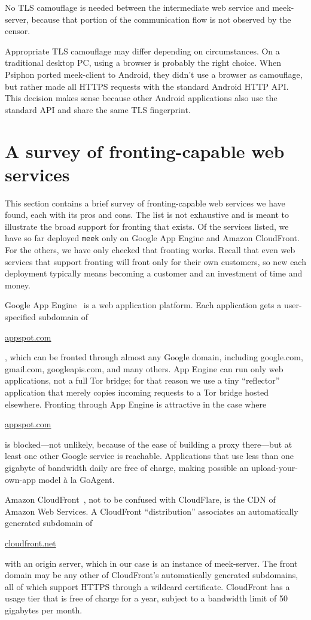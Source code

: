 \documentclass[conference]{IEEEtran}
\newcommand{\meekclient}{\mbox{meek-client}\xspace}
\newcommand{\meekserver}{\mbox{meek-server}\xspace}
\newcommand{\meek}{\texttt{meek}\xspace}
\def\urll#1{\begin{NoHyper}\url{#1}\end{NoHyper}}
\begin{document}
No TLS camouflage is needed between the intermediate web service and \meekserver,
because that portion of the communication flow is not observed by the censor.

Appropriate TLS camouflage may differ depending on circumstances.
On a traditional desktop PC, using a browser is probably the right choice.
When Psiphon ported \meekclient to Android,
they didn't use a browser as camouflage,
but rather made all HTTPS requests with the standard Android HTTP API.
This decision makes sense because other Android applications
also use the standard API and share the same TLS fingerprint.

\section{A survey of fronting-capable web services}
\label{sec:survey}

This section contains a brief survey of fronting-capable
web services we have found, each with its pros and cons.
The list is not exhaustive and is meant to illustrate the broad
support for fronting that exists.
Of the services listed, we have so far deployed \meek
only on Google App Engine and Amazon CloudFront.
For the others, we have only checked that fronting works.
Recall that even web services that support fronting
will front only for their own customers,
so new each deployment typically means becoming a customer and an investment of time and money.

Google App Engine~\cite{googleappengine}
is a web application platform.
Each application gets a user-specified subdomain of \urll{appspot.com},
which can be fronted through almost any Google domain,
including google.com, gmail.com, googleapis.com, and many others.
App Engine can run only web applications,
not a full Tor bridge;
for that reason we use a tiny ``reflector'' application
that merely copies incoming requests to a Tor bridge hosted elsewhere.
Fronting through App Engine is attractive in the case where
\urll{appspot.com} is blocked---not unlikely,
because of the ease of building a proxy there---but
at least one other Google service is reachable.
Applications that use less than one gigabyte of bandwidth daily
are free of charge,
making possible an upload-your-own-app model
à la GoAgent.

Amazon CloudFront~\cite{cloudfront},
not to be confused with CloudFlare,
is the CDN of Amazon Web Services.
A CloudFront ``distribution'' associates
an automatically generated subdomain of \urll{cloudfront.net}
with an origin server,
which in our case is an instance of \meekserver.
The front domain may be any other of CloudFront's automatically generated subdomains, all
of which support HTTPS through a wildcard certificate.
CloudFront has a usage tier that is free of charge for a year,
subject to a bandwidth limit of 50 gigabytes per month.
\end{document}
